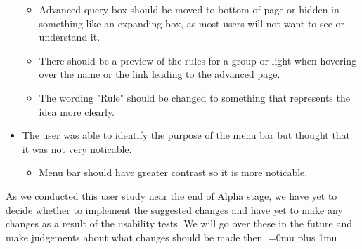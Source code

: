 \documentclass[oneside,openright]{book}
\begin{document}
\begin{itemize}
\begin{itemize}
      \item Advanced query box should be moved to bottom of page or hidden in something like an expanding box, as most users will not want to see or understand it.
      \item There should be a preview of the rules for a group or light when hovering over the name or the link leading to the advanced page.
      \item The wording "Rule" should be changed to something that represents the idea more clearly.
    \end{itemize}
  \item The user was able to identify the purpose of the menu bar but thought that it was not very noticable.
    \begin{itemize}
      \item Menu bar should have greater contrast so it is more noticable.
    \end{itemize}
\end{itemize}
As we conducted this user study near the end of Alpha stage, we have yet to decide whether to implement the suggested changes and have yet to make any changes as a result of the usability tests. We will go over these in the future and make judgements about what changes should be made then.
\newpage
\Urlmuskip=0mu plus 1mu\relax
{}

\end{document}
